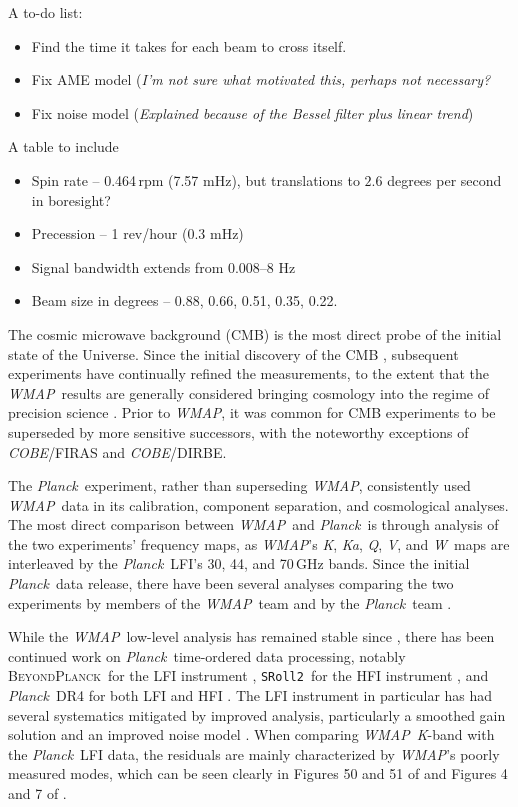 \documentclass[twocolumn]{../../common/aa}
\def\WMAP{\emph{WMAP}}
\def\COBE{\emph{COBE}}
\def\planck{\emph{Planck}}
\def\Planck{\emph{Planck}}
\def\sroll2{\texttt{SRoll2}}
\newcommand{\bp}{\textsc{BeyondPlanck}}
\newcommand{\npipe}[0]{\texttt{NPIPE}}
\newcommand{\K}[0]{\textit K}
\newcommand{\Ka}[0]{\textit{Ka}}
\newcommand{\Q}[0]{\textit Q}
\newcommand{\V}[0]{\textit V}
\newcommand{\W}[0]{\textit W}
\begin{document}
A to-do list:

\begin{itemize}
	\item Find the time it takes for each beam to cross itself.
	\item Fix AME model (\textit{I'm not sure what motivated this, perhaps not necessary?}
	\item Fix noise model (\textit{Explained because of the Bessel filter plus linear trend})
\end{itemize}

A table to include
\begin{itemize}
	\item Spin rate -- 0.464\,rpm (7.57 mHz), but translations to $2.6$ degrees per second in boresight?
	\item Precession -- 1 rev/hour (0.3 mHz)
	\item Signal bandwidth extends from 0.008--8 Hz \citep{jarosik2003a}
	\item Beam size in degrees -- 0.88, 0.66, 0.51, 0.35, 0.22.
\end{itemize}


The cosmic microwave background (CMB) is the most direct probe of the initial state of the Universe. Since the initial discovery of the CMB \citep{penzias:1965}, subsequent experiments have continually refined the measurements, to the extent that the \WMAP\ results are generally considered bringing cosmology into the regime of precision science \citep{bennett2012}. Prior to \WMAP, it was common for CMB experiments to be superseded by more sensitive successors, with the noteworthy exceptions of \COBE/FIRAS and \COBE/DIRBE.

The \planck\ experiment, rather than superseding \WMAP, consistently used \WMAP\ data in its calibration, component separation, and cosmological analyses. The most direct comparison between \WMAP\ and \Planck\ is through analysis of the two experiments' frequency maps, as \WMAP's \K, \Ka, \Q, \V, and \W\ maps are interleaved by the \Planck\ LFI's 30, 44, and 70\,GHz bands. Since the initial \Planck\ data release, there have been several analyses comparing the two experiments by members of the \WMAP\ team \citep{larson2014,addison:2016,huang:2018,weiland:2018,weiland:2022} and by the \Planck\ team \citep{planck2014-a13,planck2016-l06,planck2016-l05}.

While the \WMAP\ low-level analysis has remained stable since \citet{bennett2012}, there has been continued work on \Planck\ time-ordered data processing, notably \bp\ for the LFI instrument \citep{bp01}, \sroll2\ for the HFI instrument \citep{delouis:2019}, and \Planck\ DR4 for both LFI and HFI \citep[\npipe,][]{npipe}. The LFI instrument in particular has had several systematics mitigated by improved analysis, particularly a smoothed gain solution and an improved noise model \citep{npipe,bp06,bp07,bp10}. When comparing \WMAP\ \K-band with the \Planck\ LFI data, the residuals are mainly characterized by \WMAP's poorly measured modes, which can be seen clearly in Figures 50 and 51 of \citet{npipe} and Figures 4 and 7 of \citet{bp14}.
\end{document}

